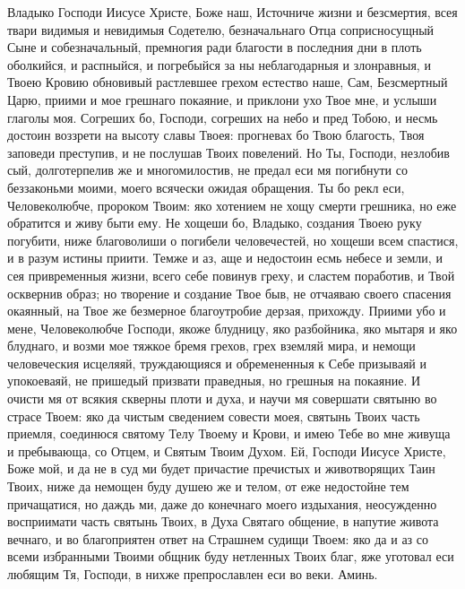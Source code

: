 \begin{mymulticols}
Владыко Господи Иисусе Христе, Боже наш, Источниче жизни и безсмертия, всея твари видимыя и невидимыя Содетелю, безначальнаго Отца соприсносущный Сыне и собезначальный, премногия ради благости в последния дни в плоть оболкийся, и распныйся, и погребыйся за ны неблагодарныя и злонравныя, и Твоею Кровию обновивый растлевшее грехом естество наше, Сам, Безсмертный Царю, приими и мое грешнаго покаяние, и приклони ухо Твое мне, и услыши глаголы моя. Согреших бо, Господи, согреших на небо и пред Тобою, и несмь достоин воззрети на высоту славы Твоея: прогневах бо Твою благость, Твоя заповеди преступив, и не послушав Твоих повелений. Но Ты, Господи, незлобив сый, долготерпелив же и многомилостив, не предал еси мя погибнути со беззаконьми моими, моего всячески ожидая обращения. Ты бо рекл еси, Человеколюбче, пророком Твоим: яко хотением не хощу смерти грешника, но еже обратится и живу быти ему. Не хощеши бо, Владыко, создания Твоею руку погубити, ниже благоволиши о погибели человечестей, но хощеши всем спастися, и в разум истины приити. Темже и аз, аще и недостоин есмь небесе и земли, и сея привременныя жизни, всего себе повинув греху, и сластем поработив, и Твой осквернив образ; но творение и создание Твое быв, не отчаяваю своего спасения окаянный, на Твое же безмерное благоутробие дерзая, прихожду. Приими убо и мене, Человеколюбче Господи, якоже блудницу, яко разбойника, яко мытаря и яко блуднаго, и возми мое тяжкое бремя грехов, грех вземляй мира, и немощи человеческия исцеляяй, труждающияся и обремененныя к Себе призываяй и упокоеваяй, не пришедый призвати праведныя, но грешныя на покаяние. И очисти мя от всякия скверны плоти и духа, и научи мя совершати святыню во страсе Твоем: яко да чистым сведением совести моея, святынь Твоих часть приемля, соединюся святому Телу Твоему и Крови, и имею Тебе во мне живуща и пребывающа, со Отцем, и Святым Твоим Духом. Ей, Господи Иисусе Христе, Боже мой, и да не в суд ми будет причастие пречистых и животворящих Таин Твоих, ниже да немощен буду душею же и телом, от еже недостойне тем причащатися, но даждь ми, даже до конечнаго моего издыхания, неосужденно восприимати часть святынь Твоих, в Духа Святаго общение, в напутие живота вечнаго, и во благоприятен ответ на Страшнем судищи Твоем: яко да и аз со всеми избранными Твоими общник буду нетленных Твоих благ, яже уготовал еси любящим Тя, Господи, в нихже препрославлен еси во веки. Аминь.



\end{mymulticols}

